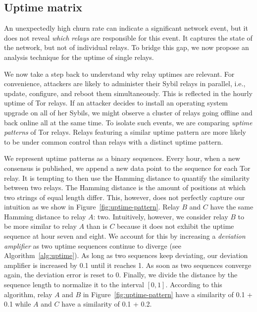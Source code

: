 \subsection{Uptime matrix}
\label{sec:uptime-matrix}
An unexpectedly high churn rate can indicate a significant network event, but it
does not reveal \emph{which relays} are responsible for this event.  It captures
the state of the network, but not of individual relays.  To bridge this gap, we
now propose an analysis technique for the uptime of single relays.

We now take a step back to understand why relay uptimes are relevant.  For
convenience, attackers are likely to administer their Sybil relays in parallel,
i.e., update, configure, and reboot them simultaneously.  This is reflected in
the hourly uptime of Tor relays.  If an attacker decides to install an operating
system upgrade on all of her Sybils, we might observe a cluster of relays going
offline and back online all at the same time.  To isolate such events, we are
comparing \emph{uptime patterns} of Tor relays.  Relays featuring a similar
uptime pattern are more likely to be under common control than relays with a
distinct uptime pattern.

We represent uptime patterns as a binary sequences.  Every hour, when a new
consensus is published, we append a new data point to the sequence for each Tor
relay.  It is tempting to then use the Hamming distance to quantify the
similarity between two relays.  The Hamming distance is the amount of positions
at which two strings of equal length differ.  This, however, does not perfectly
capture our intuition as we show in Figure~\ref{fig:uptime-pattern}.  Relay $B$
and $C$ have the same Hamming distance to relay $A$: two.  Intuitively, however,
we consider relay $B$ to be more similar to relay $A$ than is $C$ because it
does not exhibit the uptime sequence at hour seven and eight.  We account for
this by increasing a \emph{deviation amplifier} as two uptime sequences
continue to diverge (see Algorithm~\ref{alg:uptime}).  As long as two sequences
keep deviating, our deviation amplifier is increased by 0.1 until it reaches 1.
As soon as two sequences converge again, the deviation error is reset to 0.
Finally, we divide the distance by the sequence length to normalize it to the
interval $[0, 1]$.  According to this algorithm, relay $A$ and $B$ in
Figure~\ref{fig:uptime-pattern} have a similarity of 0.1 + 0.1 while $A$ and $C$
have a similarity of 0.1 + 0.2.


